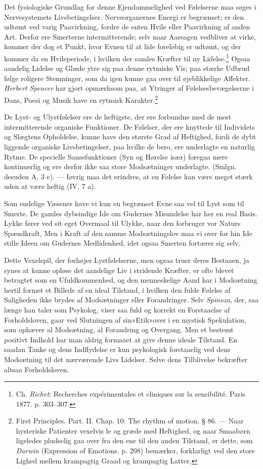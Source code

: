 \documentclass[12pt,a4paper,openany]{book}
\newcommand{\opage}[1]{\marginnote{\footnotesize\textit{[#1]}}}
\begin{document}
Det fysiologiske Grundlag for denne Ejendommelighed ved Følelserne maa
søges i Nervesystemets Livsbetingelser. Nerveorganernes Energi er
begrænset; er den udtømt ved varig Paavirkning, fordre de enten Hvile
eller Paavirkning af anden Art. Derfor ere Smerterne intermitterende;
selv naar Aarsagen vedbliver at virke, kommer der dog et Punkt, hvor
Evnen til at lide foreløbig er udtømt, og der kommer da en
\opage{329}Hvileperiode, i hvilken der samles Kræfter til ny
Lidelse.\footnote[1]{Ch. \emph{Richet}: Recherches expérimentales et cliniques
sur la sensibilité. Paris 1877. p. 303--307.} Ogsaa aandelig Lidelse og
Glæde ytre sig paa denne rytmiske Vis; paa stærke Udbrud følge roligere
Stemninger, som da igen kunne gaa over til øjeblikkelige Affekter.
\emph{Herbert Spencer} har gjort opmærksom paa, at Ytringer af
Følelsesbevægelserne i Dans, Poesi og Musik have en rytmisk
Karakter.\footnote[2]{First Principles. Part. II. Chap. 10: The rhythm
of motion. § 86. --- Naar hysteriske Patienter vexelvis le og græde med
Heftighed, og naar Smaabørn ligeledes pludselig gaa over fra den ene til
den anden Tilstand, er dette, som \emph{Darwin} (Expression of Emotions.
p. 208) bemærker, forklarligt ved den store Lighed mellem krampagtig
Graad og krampagtig Latter.}

De Lyst- og Ulystfølelser ere de heftigste, der ere forbundne med de
mest intermitterende organiske Funktioner. De Følelser, der ere knyttede
til Individets og Slægtens Opholdelse, kunne have den største Grad af
Heftighed, fordi de dybt liggende organiske Livsbetingelser, paa hvilke
de bero, ere underlagte en naturlig Rytme. De specielle Sansefunktioner
(Syn og Hørelse især) foregaa mere kontinuerlig og ere derfor ikke saa
store Modsætninger underlagte. (Smlgn. desuden A, 3 e). --- Iøvrig maa
det erindres, at en Følelse kan være meget stærk uden at være heftig
(IV, 7 a).

Som endelige Væsener have vi kun en begrænset Evne saa vel til Lyst som
til Smerte. De gamles dybsindige Ide om Gudernes Misundelse har her en
real Basis. Lykke fører ved sit eget Overmaal til Ulykke, naar den
forbruger vor Naturs Spændkraft, Men i Kraft af den samme Modsætningslov
maa vi over for hin Ide stille Ideen om Gudernes Medlidenhed, idet ogsaa
Smerten fortærer sig selv.

Dette Vexelspil, der forhøjer Lystfølelserne, men ogsaa truer deres
Bestaaen, ja synes at kunne opløse det aandelige Liv i stridende
Kræfter, er ofte blevet betragtet som en Ufuldkommenhed, og den
menneskelige Aand har i Modsætning hertil formet et Billede af en ideal
Tilstand, i hvilken den fulde Følelse af Saligheden ikke brydes af
Modsætninger eller Forandringer. Selv \emph{Spinoza}, der, saa længe han
taler som
\opage{330}Psykolog, viser saa fuld og korrekt en Forstaaelse af
Forholdsloven, gaar ved Slutningen af sin«Etik»over i en mystisk
Spekulation, som ophæver al Modsætning, al Forandring og Overgang. Men
et bestemt positivt Indhold har man aldrig formaaet at give denne ideale
Tilstand. En saadan Tanke og dens Indflydelse er kun psykologisk
forstaaelig ved dens Modsætning til det nærværende Livs Lidelser. Selve
dens Tilblivelse bekræfter altsaa Forholdsloven.
\end{document}
